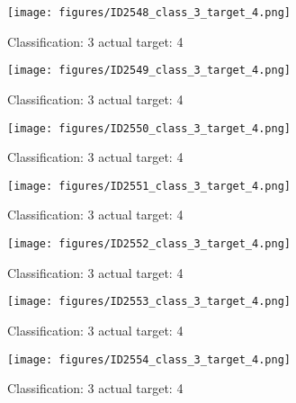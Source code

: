 \begin{figure}[h!]
\begin{center}
\texttt{[image: figures/ID2548\_class\_3\_target\_4.png]}
\end{center}
\caption{ Classification: 3 actual target: 4}
\label{fig:ID2548_class_3_target_4}
\end{figure}
\begin{figure}[h!]
\begin{center}
\texttt{[image: figures/ID2549\_class\_3\_target\_4.png]}
\end{center}
\caption{ Classification: 3 actual target: 4}
\label{fig:ID2549_class_3_target_4}
\end{figure}
\begin{figure}[h!]
\begin{center}
\texttt{[image: figures/ID2550\_class\_3\_target\_4.png]}
\end{center}
\caption{ Classification: 3 actual target: 4}
\label{fig:ID2550_class_3_target_4}
\end{figure}
\begin{figure}[h!]
\begin{center}
\texttt{[image: figures/ID2551\_class\_3\_target\_4.png]}
\end{center}
\caption{ Classification: 3 actual target: 4}
\label{fig:ID2551_class_3_target_4}
\end{figure}
\begin{figure}[h!]
\begin{center}
\texttt{[image: figures/ID2552\_class\_3\_target\_4.png]}
\end{center}
\caption{ Classification: 3 actual target: 4}
\label{fig:ID2552_class_3_target_4}
\end{figure}
\begin{figure}[h!]
\begin{center}
\texttt{[image: figures/ID2553\_class\_3\_target\_4.png]}
\end{center}
\caption{ Classification: 3 actual target: 4}
\label{fig:ID2553_class_3_target_4}
\end{figure}
\begin{figure}[h!]
\begin{center}
\texttt{[image: figures/ID2554\_class\_3\_target\_4.png]}
\end{center}
\caption{ Classification: 3 actual target: 4}
\label{fig:ID2554_class_3_target_4}
\end{figure}
